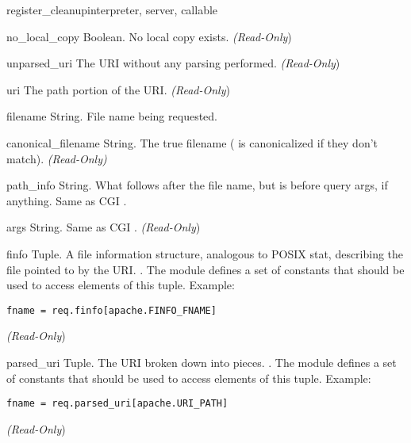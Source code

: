 \begin{funcdesc}{register_cleanup}{interpreter, server, callable}
\begin{memberdesc}[request]{no_local_copy}
  Boolean. No local copy exists.
  \emph{(Read-Only})
\end{memberdesc}

\begin{memberdesc}[request]{unparsed_uri}
  The URI without any parsing performed.
  \emph{(Read-Only})
\end{memberdesc}

\begin{memberdesc}[request]{uri}
  The path portion of the URI.
  \emph{(Read-Only})
\end{memberdesc}

\begin{memberdesc}[request]{filename}
  String. File name being requested.
\end{memberdesc}

\begin{memberdesc}[request]{canonical_filename}
  String. The true filename ( is canonicalized if
  they don't match).  \emph{(Read-Only)}
\end{memberdesc}

\begin{memberdesc}[request]{path_info}
  String. What follows after the file name, but is before query args, if
  anything. Same as CGI .
\end{memberdesc}

\begin{memberdesc}[request]{args}
  String. Same as CGI .
  \emph{(Read-Only})
\end{memberdesc}

\begin{memberdesc}[request]{finfo}
  Tuple. A file information structure, analogous to POSIX stat,
  describing the file pointed to by the URI.  . The  module defines a set of 
  constants that should be used to access elements of this
  tuple. Example:
  \begin{verbatim}
fname = req.finfo[apache.FINFO_FNAME]
  \end{verbatim}
  \emph{(Read-Only})
\end{memberdesc}

\begin{memberdesc}[request]{parsed_uri}
  Tuple. The URI broken down into pieces.
  . 
  The  module defines a set of  constants that
  should be used to access elements of this tuple. Example:
  \begin{verbatim}
fname = req.parsed_uri[apache.URI_PATH]
  \end{verbatim}
  \emph{(Read-Only})
\end{memberdesc}


\end{funcdesc}
